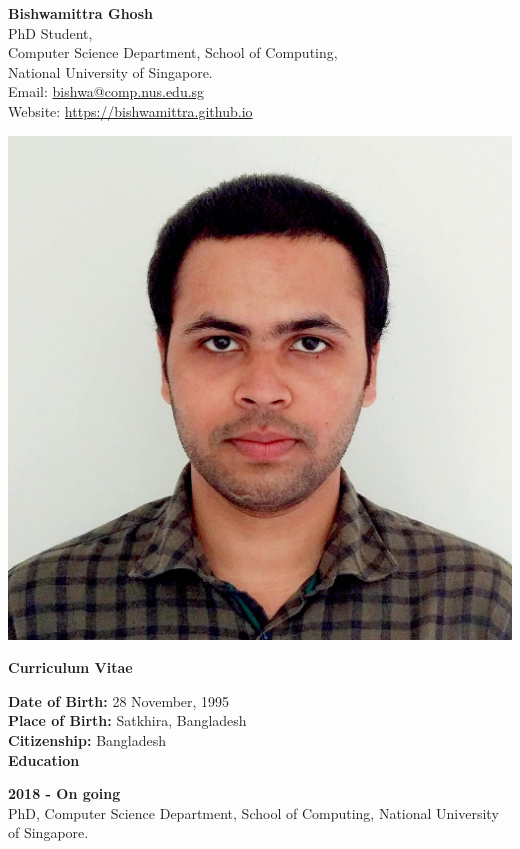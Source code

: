\documentclass[a4paper,11pt,final]{article}
\newcommand{\CVSection}[1]
{\Large\textbf{#1}\par
	\SmallSep\normalsize\normalfont}
\newcommand{\CVItem}[1]
{\textbf{\color{Black} #1}}
\newcommand{\SmallSep}{\vspace{0.5em}}
\begin{document}
	
	\begin{minipage}{0.8\textwidth}%
	\Large \textbf{Bishwamittra Ghosh}\\
	\normalsize PhD Student,\\
	 Computer Science Department, School of Computing,\\
	 National University of Singapore.\\
	 Email: \url{bishwa@comp.nus.edu.sg}  \\
	 Website: \url{https://bishwamittra.github.io}
	\end{minipage}%
	\hfill%
	\begin{minipage}{0.2\textwidth}
		\includegraphics[width=\linewidth]{photo.jpg}
		
	\end{minipage}


\vspace{.5 cm}
\Large \centerline{ \textbf{Curriculum Vitae}}
\vspace{.5 cm}
\normalsize
\normalfont
\CVItem{Date of Birth:}  28  November,  1995 \\
\CVItem{Place of Birth:} Satkhira, Bangladesh\\
\CVItem{Citizenship:} Bangladesh\\

\CVSection{Education}
\CVItem{ 2018  - On going}\\
PhD, Computer Science Department, School of Computing, National University of Singapore.
\SmallSep
\end{document}

